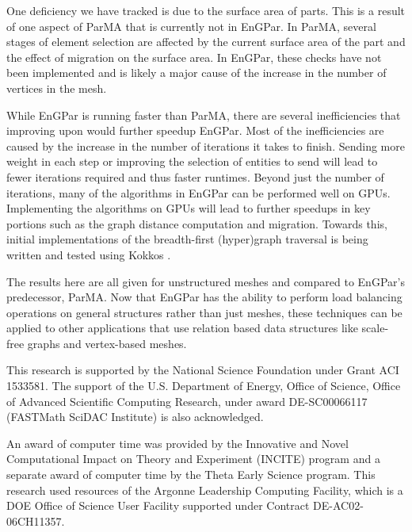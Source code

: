 One deficiency we have tracked is due to
the surface area of parts. This is a result of one
aspect of ParMA that is currently not in EnGPar.
In ParMA, several stages of element selection are affected by the current
surface area of the part and the effect of migration
on the surface area. In EnGPar, these
checks have not been implemented and is likely a major
cause of the increase in the number of vertices in the mesh.

While EnGPar is running faster than ParMA, there
are several inefficiencies that improving upon would
further speedup EnGPar. Most of the inefficiencies
are caused by the increase in the number of iterations it
takes to finish. Sending more weight
in each step or improving the selection of entities
to send will lead to fewer iterations required and
thus faster runtimes. Beyond just the number of
iterations, many of the algorithms in EnGPar can be
performed well on GPUs. Implementing the algorithms
on GPUs will lead to further speedups in key portions
such as the graph distance computation and migration.
Towards this, initial implementations of the
breadth-first (hyper)graph traversal is being written
and tested using Kokkos \cite{edwards2013kokkos}.

The results here are all given for unstructured meshes
and compared to EnGPar's predecessor, ParMA. Now that
EnGPar has the ability to perform load balancing
operations on general structures rather than just
meshes, these techniques can be applied to other
applications that use relation based data structures
like scale-free graphs and vertex-based meshes.

\begin{acks}
This research is supported by the National Science
Foundation under Grant ACI 1533581. The support of
the U.S. Department of Energy, Office of Science,
Office of Advanced Scientific Computing Research,
under award DE-SC00066117 (FASTMath SciDAC Institute)
is also acknowledged.

An award of computer time was provided by the Innovative and Novel
Computational Impact on Theory and Experiment (INCITE) program and a separate
award of computer time by the Theta Early Science program.
This research used resources of the Argonne Leadership Computing Facility,
which is a DOE Office of Science User Facility supported under Contract
DE-AC02-06CH11357.
\end{acks}
